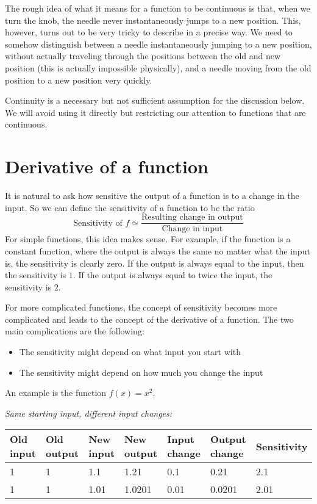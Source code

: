 \documentclass{math-deane}
\begin{document}
The rough idea of what it means for a function to be continuous is that, when we turn the knob, the needle never instantaneously jumps to a new position. This, however, turns out to be very tricky to describe in a precise way. We need to somehow distinguish between a needle instantaneously jumping to a new position, without actually traveling through the positions between the old and new position (this is actually impossible physically), and a needle moving from the old position to a new position very quickly.

Continuity is a necessary but not sufficient assumption for the discussion below. We will avoid using it directly but restricting our attention to functions that are continuous.

\section{Derivative of a function}

It is natural to ask how sensitive the output of a function is to a change in the input. So we can define the sensitivity of a function to be the ratio
\[
\text{Sensitivity of }f \simeq \frac{\text{Resulting change in output}}{\text{Change in input}}
\]
For simple functions, this idea makes sense. For example, if the function is a constant function, where the output is always the same no matter what the input is, the sensitivity is clearly zero. If the output is always equal to the input, then the sensitivity is $1$. If the output is always equal to twice the input, the sensitivity is $2$.

For more complicated functions, the concept of sensitivity becomes more complicated and leads to the concept of the derivative of a function. The two main complications are the following:
\begin{itemize}
\item The sensitivity might depend on what input you start with
\item The sensitivity might depend on how much you change the input
\end{itemize}

An example is the function $f(x) = x^2$. 

{\em Same starting input, different input changes:}\\
\begin{tabular}{|p{0.5in}|p{0.5in}|p{0.5in}|p{0.5in}|p{0.5in}|p{0.5in}|p{0.75in}|}
\hline
Old input&Old output&New input& New output & Input change &
Output change & Sensitivity \\ \hline\hline
1 & 1 & 1.1 & 1.21 & 0.1 & 0.21 & 2.1\\ \hline
1 & 1 & 1.01 & 1.0201 & 0.01 & 0.0201 & 2.01\\ \hline
\end{tabular}
\end{document}
